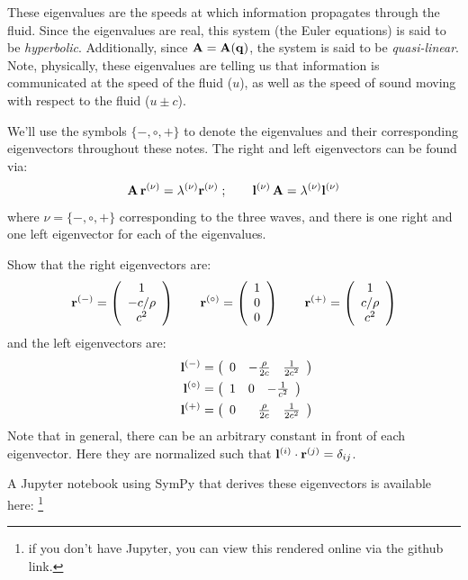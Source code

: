 These eigenvalues are the speeds at which information propagates
through the fluid.  Since the eigenvalues are real, this system (the
Euler equations) is said to be {\em hyperbolic}.  Additionally, since
${\bf A} = {\bf A}({\bf q})$, the system is said to be {\em quasi-linear}.  Note,
physically, these eigenvalues are telling us that information is
communicated at the speed of the fluid ($u$), as well as the speed of
sound moving with respect to the fluid ($u \pm c$).

We'll use the symbols $\{-,\circ,+\}$ to denote the eigenvalues and their
corresponding eigenvectors throughout these notes.
%
The right and left eigenvectors can be found via:
\begin{equation}
{\bf A} \, {\bf r}^{(\nu)} = \lambda^{(\nu)} {\bf r}^{(\nu)} \; ;
\qquad
{\bf l}^{(\nu)} \, {\bf A}  = \lambda^{(\nu)} {\bf l}^{(\nu)}
\end{equation}
where $\nu = \{-,\circ,+\}$ corresponding to the three waves, and
there is one right and one left eigenvector for each of the eigenvalues.
%
\begin{exercise}
{
Show that the right eigenvectors are:
\begin{equation}
\label{eq:euler:primRevs}
\rb^\evm = \left ( \begin{array}{c} 1 \\ -c/\rho \\ c^2 \end{array} \right )
%
\qquad
\rb^\evz = \left ( \begin{array}{c} 1 \\ 0 \\ 0  \end{array} \right )
%
\qquad
\rb^\evp = \left ( \begin{array}{c} 1 \\ c/\rho \\ c^2 \end{array} \right )
\end{equation}
and the left eigenvectors are:
\begin{align}
\lb^\evm &= \left ( \begin{array}{ccc} 0 & -\frac{\rho}{2c} & \frac{1}{2c^2}
                  \end{array} \right ) \\
%
\qquad
\lb^\evz &= \left ( \begin{array}{ccc} 1 & 0 & -\frac{1}{c^2}  \end{array} \right ) \\
%
\qquad
\lb^\evp &= \left ( \begin{array}{ccc} 0 & \phantom{+}\frac{\rho}{2c} & \frac{1}{2c^2} \end{array} \right )
\end{align}
Note that in general, there can be an arbitrary constant in front of each
eigenvector.  Here they are normalized such that
${\bf l}^{(i)} \cdot {\bf r}^{(j)} = \delta_{ij}$.
}
\end{exercise}
A {\sf Jupyter} notebook using {\sf SymPy} that derives these
eigenvectors is available here:
\footnote{if you don't have {\sf Jupyter}, you can view this rendered online via the github link.}

